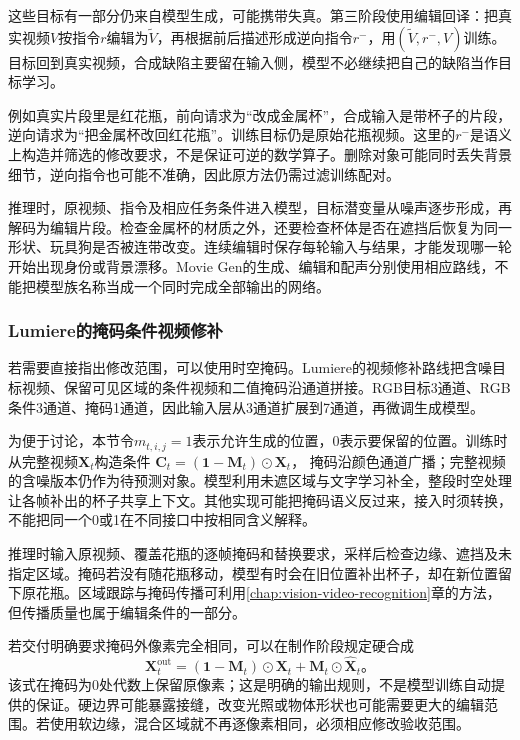 这些目标有一部分仍来自模型生成，可能携带失真。第三阶段使用编辑回译：把真实视频$V$按指令$r$编辑为$\widetilde V$，再根据前后描述形成逆向指令$r^{-}$，用$(\widetilde V,r^{-},V)$训练。目标回到真实视频，合成缺陷主要留在输入侧，模型不必继续把自己的缺陷当作目标学习。

例如真实片段里是红花瓶，前向请求为“改成金属杯”，合成输入是带杯子的片段，逆向请求为“把金属杯改回红花瓶”。训练目标仍是原始花瓶视频。这里的$r^{-}$是语义上构造并筛选的修改要求，不是保证可逆的数学算子。删除对象可能同时丢失背景细节，逆向指令也可能不准确，因此原方法仍需过滤训练配对。

推理时，原视频、指令及相应任务条件进入模型，目标潜变量从噪声逐步形成，再解码为编辑片段。检查金属杯的材质之外，还要检查杯体是否在遮挡后恢复为同一形状、玩具狗是否被连带改变。连续编辑时保存每轮输入与结果，才能发现哪一轮开始出现身份或背景漂移。Movie Gen的生成、编辑和配声分别使用相应路线，不能把模型族名称当成一个同时完成全部输出的网络。

\subsubsection{Lumiere的掩码条件视频修补}
\label{sec:vision-multigen-video-inpainting}

若需要直接指出修改范围，可以使用时空掩码。Lumiere的视频修补路线把含噪目标视频、保留可见区域的条件视频和二值掩码沿通道拼接。RGB目标3通道、RGB条件3通道、掩码1通道，因此输入层从3通道扩展到7通道，再微调生成模型。

为便于讨论，本节令$m_{t,i,j}=1$表示允许生成的位置，0表示要保留的位置。训练时从完整视频$\bm X_t$构造条件
$\bm C_t=(\bm1-\bm M_t)\odot\bm X_t$，
掩码沿颜色通道广播；完整视频的含噪版本仍作为待预测对象。模型利用未遮区域与文字学习补全，整段时空处理让各帧补出的杯子共享上下文。其他实现可能把掩码语义反过来，接入时须转换，不能把同一个0或1在不同接口中按相同含义解释。

推理时输入原视频、覆盖花瓶的逐帧掩码和替换要求，采样后检查边缘、遮挡及未指定区域。掩码若没有随花瓶移动，模型有时会在旧位置补出杯子，却在新位置留下原花瓶。区域跟踪与掩码传播可利用\ref{chap:vision-video-recognition}章的方法，但传播质量也属于编辑条件的一部分。

若交付明确要求掩码外像素完全相同，可以在制作阶段规定硬合成
\begin{equation}
  \bm X_t^{\mathrm{out}}
  =(\bm1-\bm M_t)\odot\bm X_t+
     \bm M_t\odot\widehat{\bm X}_t\text{。}
  \label{eq:vision-edit-composite}
\end{equation}
该式在掩码为0处代数上保留原像素；这是明确的输出规则，不是模型训练自动提供的保证。硬边界可能暴露接缝，改变光照或物体形状也可能需要更大的编辑范围。若使用软边缘，混合区域就不再逐像素相同，必须相应修改验收范围。

